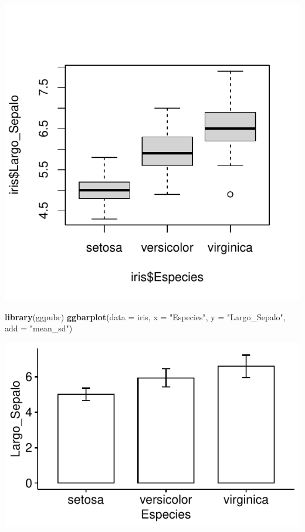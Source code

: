 \documentclass[
]{book}
\newenvironment{Shaded}{\begin{snugshade}}{\end{snugshade}}
\newcommand{\AttributeTok}[1]{\textcolor[rgb]{0.13,0.29,0.53}{#1}}
\newcommand{\FunctionTok}[1]{\textcolor[rgb]{0.13,0.29,0.53}{\textbf{#1}}}
\newcommand{\NormalTok}[1]{#1}
\newcommand{\StringTok}[1]{\textcolor[rgb]{0.31,0.60,0.02}{#1}}
\begin{document}
\begin{center}\includegraphics{R_Manual_files/figure-latex/unnamed-chunk-245-1} \end{center}

\begin{Shaded}
\begin{Highlighting}[]
\FunctionTok{library}\NormalTok{(ggpubr)}
\FunctionTok{ggbarplot}\NormalTok{(}\AttributeTok{data =}\NormalTok{ iris, }\AttributeTok{x =} \StringTok{"Especies"}\NormalTok{, }\AttributeTok{y =} \StringTok{"Largo\_Sepalo"}\NormalTok{, }\AttributeTok{add =} \StringTok{"mean\_sd"}\NormalTok{)}
\end{Highlighting}
\end{Shaded}

\begin{center}\includegraphics{R_Manual_files/figure-latex/unnamed-chunk-246-1} \end{center}
\end{document}

